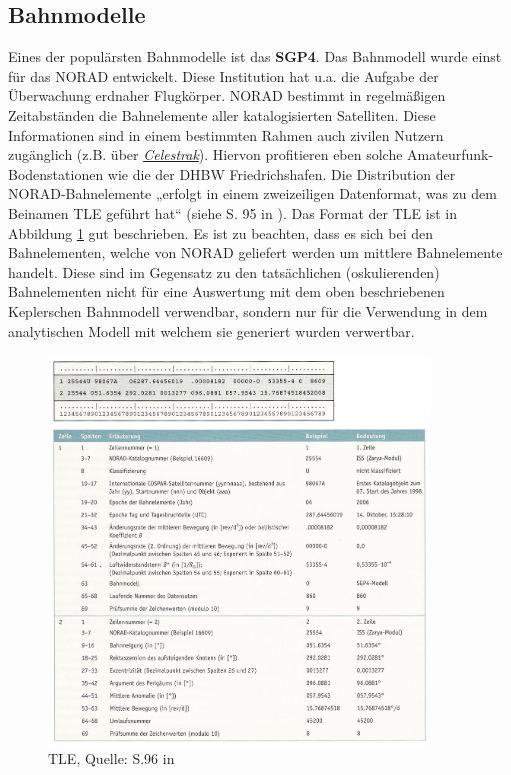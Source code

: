 \subsection{Bahnmodelle}
\label{chap:models}
Eines der populärsten Bahnmodelle ist das \textbf{\ac{SGP4}}. Das Bahnmodell wurde einst für das \ac{NORAD} entwickelt. Diese Institution hat u.a. die Aufgabe der Überwachung erdnaher Flugkörper. \ac{NORAD} bestimmt in regelmäßigen Zeitabständen die Bahnelemente aller katalogisierten Satelliten. Diese Informationen sind in einem bestimmten Rahmen auch zivilen Nutzern zugänglich (z.B. über \href{http://celestrak.com/}{\textit{Celestrak}}). Hiervon profitieren eben solche Amateurfunk-Bodenstationen wie die der DHBW Friedrichshafen. Die Distribution der \ac{NORAD}-Bahnelemente „erfolgt in einem zweizeiligen Datenformat, was zu dem Beinamen \ac{TLE} geführt hat“ (siehe S. 95 in \cite{HandRaum}). Das Format der \ac{TLE} ist in Abbildung \ref{fig:tle} gut beschrieben. Es ist zu beachten, dass es sich bei den Bahnelementen, welche von \ac{NORAD} geliefert werden um mittlere Bahnelemente handelt. Diese sind im Gegensatz zu den tatsächlichen (oskulierenden) Bahnelementen nicht für eine Auswertung mit dem oben beschriebenen Keplerschen Bahnmodell verwendbar, sondern nur für die Verwendung in dem analytischen Modell mit welchem sie generiert wurden verwertbar. 
\begin{figure}[h]                                                                           %
	\centering                                                                            	%
	\includegraphics[width=0.9\textwidth]{./images/tle.jpg}              			            %
	\caption[\ac{TLE}]{\ac{TLE}, Quelle: S.96 in \cite{HandRaum}}                           %
	\label{fig:tle}                                                                         %
\end{figure}                                                                              	%
